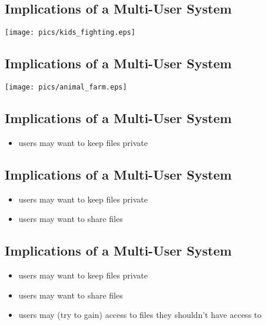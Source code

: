 \documentclass[xga]{xdvislides}
\begin{document}
\subsection{Implications of a Multi-User System}
\vspace*{\fill}
\begin{center}
	\texttt{[image: pics/kids\_fighting.eps]}
\end{center}
\vspace*{\fill}


\subsection{Implications of a Multi-User System}
\vspace*{\fill}
\begin{center}
	\texttt{[image: pics/animal\_farm.eps]}
\end{center}
\vspace*{\fill}

\subsection{Implications of a Multi-User System}
\begin{itemize}
	\item users may want to keep files private
\end{itemize}

\subsection{Implications of a Multi-User System}
\begin{itemize}
	\item users may want to keep files private
	\item users may want to share files
\end{itemize}

\subsection{Implications of a Multi-User System}
\begin{itemize}
	\item users may want to keep files private
	\item users may want to share files
	\item users may (try to gain) access to files they shouldn't have access to
\end{itemize}
\end{document}
